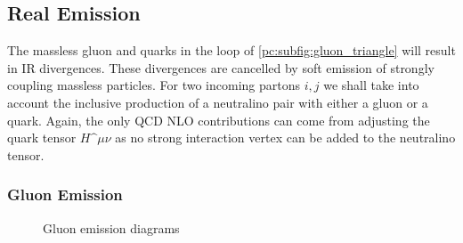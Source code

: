 \documentclass[../main.tex]{subfiles}
\begin{document}
\subsection{Real Emission}
\label{pc:subsec:real_emission}

The massless gluon and quarks in the loop of \cref{pc:subfig:gluon_triangle} will result in IR divergences.
These divergences are cancelled by soft emission of strongly coupling massless particles.
For two incoming partons \(i, j\) we shall take into account the inclusive production of a neutralino pair with either a gluon or a quark.
Again, the only QCD NLO contributions can come from adjusting the quark tensor \(H\^{\mu\nu}\) as no strong interaction vertex can be added to the neutralino tensor.

\subsubsection*{Gluon Emission}
\begin{figure}[ht!]
  \centering
  \begin{subfigure}{0.49\textwidth}
    \centering
    \caption{}
    \label{pc:subfig:gluon_emission_t}
  \end{subfigure}
  \begin{subfigure}{0.49\textwidth}
    \centering
    \caption{}
    \label{pc:subfig:gluon_emission_u}
  \end{subfigure}
  \caption{Gluon emission diagrams}
  \label{pc:fig:gluon_emission}
\end{figure}
\end{document}
